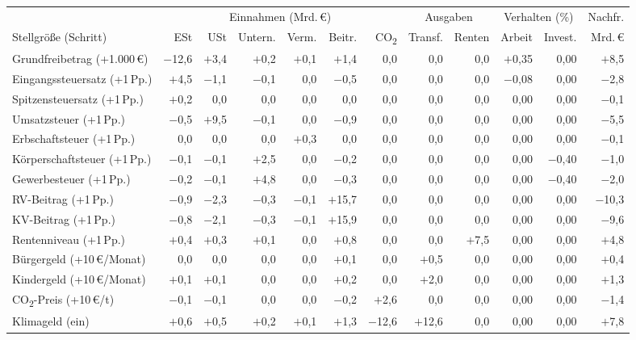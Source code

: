 \begin{tabular}{@{}l*{11}{r}@{}}
\toprule
 & \multicolumn{6}{c}{Einnahmen (Mrd.\,\euro{})} & \multicolumn{2}{c}{Ausgaben} & \multicolumn{2}{c}{Verhalten (\%)} & Nachfr. \\
\cmidrule(lr){2-7}\cmidrule(lr){8-9}\cmidrule(lr){10-11}
Stellgröße (Schritt) & ESt & USt & Untern. & Verm. & Beitr. & CO\textsubscript{2} & Transf. & Renten & Arbeit & Invest. & Mrd.\,\euro{} \\
\midrule
Grundfreibetrag (+1.000\,\euro{}) & $-$12,6 & $+$3,4 & $+$0,2 & $+$0,1 & $+$1,4 & 0,0 & 0,0 & 0,0 & $+$0,35 & 0,00 & $+$8,5 \\
Eingangssteuersatz (+1\,Pp.) & $+$4,5 & $-$1,1 & $-$0,1 & 0,0 & $-$0,5 & 0,0 & 0,0 & 0,0 & $-$0,08 & 0,00 & $-$2,8 \\
Spitzensteuersatz (+1\,Pp.) & $+$0,2 & 0,0 & 0,0 & 0,0 & 0,0 & 0,0 & 0,0 & 0,0 & 0,00 & 0,00 & $-$0,1 \\
Umsatzsteuer (+1\,Pp.) & $-$0,5 & $+$9,5 & $-$0,1 & 0,0 & $-$0,9 & 0,0 & 0,0 & 0,0 & 0,00 & 0,00 & $-$5,5 \\
Erbschaftsteuer (+1\,Pp.) & 0,0 & 0,0 & 0,0 & $+$0,3 & 0,0 & 0,0 & 0,0 & 0,0 & 0,00 & 0,00 & $-$0,1 \\
Körperschaftsteuer (+1\,Pp.) & $-$0,1 & $-$0,1 & $+$2,5 & 0,0 & $-$0,2 & 0,0 & 0,0 & 0,0 & 0,00 & $-$0,40 & $-$1,0 \\
Gewerbesteuer (+1\,Pp.) & $-$0,2 & $-$0,1 & $+$4,8 & 0,0 & $-$0,3 & 0,0 & 0,0 & 0,0 & 0,00 & $-$0,40 & $-$2,0 \\
RV-Beitrag (+1\,Pp.) & $-$0,9 & $-$2,3 & $-$0,3 & $-$0,1 & $+$15,7 & 0,0 & 0,0 & 0,0 & 0,00 & 0,00 & $-$10,3 \\
KV-Beitrag (+1\,Pp.) & $-$0,8 & $-$2,1 & $-$0,3 & $-$0,1 & $+$15,9 & 0,0 & 0,0 & 0,0 & 0,00 & 0,00 & $-$9,6 \\
Rentenniveau (+1\,Pp.) & $+$0,4 & $+$0,3 & $+$0,1 & 0,0 & $+$0,8 & 0,0 & 0,0 & $+$7,5 & 0,00 & 0,00 & $+$4,8 \\
Bürgergeld (+10\,\euro{}/Monat) & 0,0 & 0,0 & 0,0 & 0,0 & $+$0,1 & 0,0 & $+$0,5 & 0,0 & 0,00 & 0,00 & $+$0,4 \\
Kindergeld (+10\,\euro{}/Monat) & $+$0,1 & $+$0,1 & 0,0 & 0,0 & $+$0,2 & 0,0 & $+$2,0 & 0,0 & 0,00 & 0,00 & $+$1,3 \\
CO\textsubscript{2}-Preis (+10\,\euro{}/t) & $-$0,1 & $-$0,1 & 0,0 & 0,0 & $-$0,2 & $+$2,6 & 0,0 & 0,0 & 0,00 & 0,00 & $-$1,4 \\
Klimageld (ein) & $+$0,6 & $+$0,5 & $+$0,2 & $+$0,1 & $+$1,3 & $-$12,6 & $+$12,6 & 0,0 & 0,00 & 0,00 & $+$7,8 \\

\end{tabular}
